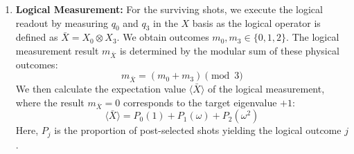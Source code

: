 \begin{enumerate}
    \textit{Simulation: In the numerical simulation of the syndrome extraction, we model interaction errors by inserting the two-qutrit channel $\mathcal{E}^{(2)}_{\mathcal{D}}$ of \autoref{sub:noise_models} immediately following every two-qudit gate (generalized $CX$ or $CX^\dagger$) interacting the ancilla and data qutrits. The single-qutrit channel is likewise applied to the ancilla immediately following the Hadamard gates ($H_3, H_3^{-1}$) in the $X$-type stabilizer circuits, as illustrated in \autoref{fig:lrb_d}. Under the SI1000 model the resets, readouts, and idling qutrits in these circuits carry the additional channels listed in \autoref{tab:si1000-noise}.}
    
    
    \item \textbf{Logical Measurement:} For the surviving shots, we execute the logical readout by measuring $q_0$ and $q_3$ in the $X$ basis as the logical operator is defined as $\bar{X} = X_0 \otimes X_3$. We obtain outcomes $m_0, m_3 \in \{0, 1, 2\}$. The logical measurement result $m_{\bar{X}}$ is determined by the modular sum of these physical outcomes:
    \begin{equation}
        m_{\bar{X}} = (m_0 + m_3) \pmod 3
    \end{equation}
    We then calculate the expectation value $\langle \bar{X} \rangle$ of the logical measurement, where the result $m_{\bar{X}}=0$ corresponds to the target eigenvalue $+1$:
    \begin{equation}
        \langle \bar{X} \rangle = P_0(1) + P_1(\omega) + P_2(\omega^2)
    \end{equation}
    Here, $P_j$ is the proportion of post-selected shots yielding the logical outcome $j$.
\end{enumerate}
